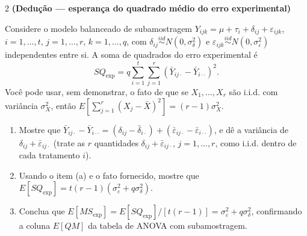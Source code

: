 \documentclass[11pt]{article}
\begin{document}
\begin{questao}{2} \textbf{(Dedução --- esperança do quadrado médio do erro experimental)}

Considere o modelo balanceado de subamostragem $Y_{ijk} = \mu + \tau_i + \delta_{ij} +
\varepsilon_{ijk}$, $i=1,\ldots,t$, $j=1,\ldots,r$, $k=1,\ldots,q$, com $\delta_{ij}
\overset{iid}{\sim} N(0,\sigma_\delta^2)$ e $\varepsilon_{ijk} \overset{iid}{\sim}
N(0,\sigma_\varepsilon^2)$ independentes entre si. A soma de quadrados do erro experimental é
$$
SQ_{\text{exp}} = q\sum_{i=1}^t\sum_{j=1}^r (\bar Y_{ij\cdot} - \bar Y_{i\cdot\cdot})^2 .
$$
Você pode usar, sem demonstrar, o fato de que se $X_1,\ldots,X_r$ são i.i.d. com variância
$\sigma_X^2$, então $E\!\left[\sum_{j=1}^r (X_j-\bar X)^2\right] = (r-1)\sigma_X^2$.

\begin{enumerate}[label=(\alph*)]
  \item Mostre que $\bar Y_{ij\cdot} - \bar Y_{i\cdot\cdot} = (\delta_{ij}-\bar\delta_{i\cdot}) +
    (\bar\varepsilon_{ij\cdot} - \bar\varepsilon_{i\cdot\cdot})$, e dê a variância de
    $\delta_{ij}+\bar\varepsilon_{ij\cdot}$ (trate as $r$ quantidades $\delta_{ij} +
    \bar\varepsilon_{ij\cdot}$, $j=1,\ldots,r$, como i.i.d. dentro de cada tratamento $i$).
  \item Usando o item (a) e o fato fornecido, mostre que $E[SQ_{\text{exp}}] = t(r-1)(\sigma_\varepsilon^2
    + q\sigma_\delta^2)$.
  \item Conclua que $E[MS_{\text{exp}}] = E[SQ_{\text{exp}}]/[t(r-1)] = \sigma_\varepsilon^2 +
    q\sigma_\delta^2$, confirmando a coluna $E[QM]$ da tabela de ANOVA com subamostragem.
\end{enumerate}
\end{questao}
\end{document}
